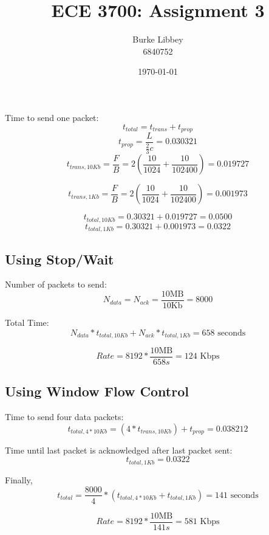 \documentclass[10pt,letterpaper]{article}
\begin{document}
\author{Burke Libbey \\ 6840752}
\title{ECE 3700: Assignment 3}
\date{\today}

\maketitle


\noindent Time to send one packet:
\[ t_{total} = t_{trans} + t_{prop} \]
\[ t_{prop} = \frac{L}{\frac{2}{3}c} = 0.030321 \]
\[ t_{trans,10Kb} = \frac{F}{B} = 2(\frac{10}{1024} + \frac{10}{102400}) = 0.019727 \]

\[ t_{trans,1Kb} = \frac{F}{B} = 2(\frac{10}{1024} + \frac{10}{102400}) = 0.001973 \]

\[ t_{total,10Kb} = 0.30321 + 0.019727 = 0.0500 \]
\[ t_{total,1Kb} = 0.30321 + 0.001973 = 0.0322 \]

\subsection*{Using Stop/Wait}

\noindent Number of packets to send:
\[ N_{data} = N_{ack} = \frac{10\mbox{MB}}{10\mbox{Kb}} = 8000 \]


\noindent Total Time:
\[ N_{data} * t_{total,10Kb} + N_{ack} * t_{total,1Kb} = 658 \mbox{~seconds} \]

\[ Rate = 8192*\frac{10\mbox{MB}}{658s} = 124\mbox{~Kbps}  \]

\newpage
\subsection*{Using Window Flow Control}

\noindent  Time to send four data packets:
\[ t_{total,4*10Kb} = (4 * t_{trans,10Kb}) + t_{prop} = 0.038212 \]

\noindent  Time until last packet is acknowledged after last packet sent:
\[ t_{total,1Kb} = 0.0322 \]

\noindent Finally, 
\[ t_{total} = \frac{8000}{4} * (t_{total,4*10Kb}+t_{total,1Kb}) = 141 \mbox{~seconds} \]

\[ Rate = 8192*\frac{10\mbox{MB}}{141s} = 581\mbox{~Kbps}  \]
\end{document}
